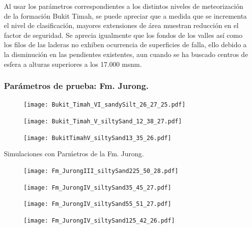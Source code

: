 Al usar los par\'ametros correspondientes a los distintos niveles de meteorizaci\'on de la formaci\'on Bukit Timah, se puede apreciar que a medida que se incrementa el nivel de clasificaci\'on, mayores extensiones de \'area muestran reducci\'on en el factor de seguridad.
Se aprecia igualmente que los fondos de los valles as\'i como los filos de las laderas no exhiben ocurrencia de superficies de falla, ello debido a la disminuci\'on en las pendientes existentes, aun cuando se ha buscado centros de esfera a alturas superiores a los 17.000 msnm.


\subsubsection{Par\'ametros de prueba: Fm. Jurong.}

\begin{figure}[H]
\centering
\begin{minipage}{.45\linewidth}
  \texttt{[image: Bukit\_Timah\_VI\_sandySilt\_26\_27\_25.pdf]}
  \label{fig:bukit1}
\end{minipage}
\hspace{.05\linewidth}
\begin{minipage}{.45\linewidth}
  \texttt{[image: Bukit\_Timah\_V\_siltySand\_12\_38\_27.pdf]}
  \label{fig:bukit2}
\end{minipage}
\begin{minipage}{.45\linewidth}
  \texttt{[image: BukitTimahV\_siltySand13\_35\_26.pdf]}
  \label{fig:bukit3}
\end{minipage}
\end{figure}




Simulaciones con Par\'metros de la Fm. Jurong.


\begin{figure}[H]
\centering
\begin{minipage}{.45\linewidth}
  \texttt{[image: Fm\_JurongIII\_siltySand225\_50\_28.pdf]}
  \label{fig:jurong1}
\end{minipage}
\hspace{.05\linewidth}
\begin{minipage}{.45\linewidth}
  \texttt{[image: Fm\_JurongIV\_siltySand35\_45\_27.pdf]}
  \label{fig:jurong2}
\end{minipage}
\begin{minipage}{.45\linewidth}
  \texttt{[image: Fm\_JurongIV\_siltySand55\_51\_27.pdf]}
  \label{fig:jurong3}
\end{minipage}
\begin{minipage}{.45\linewidth}
  \texttt{[image: Fm\_JurongIV\_siltySand125\_42\_26.pdf]}
  \label{fig:jurong4}
\end{minipage}
\end{figure}


